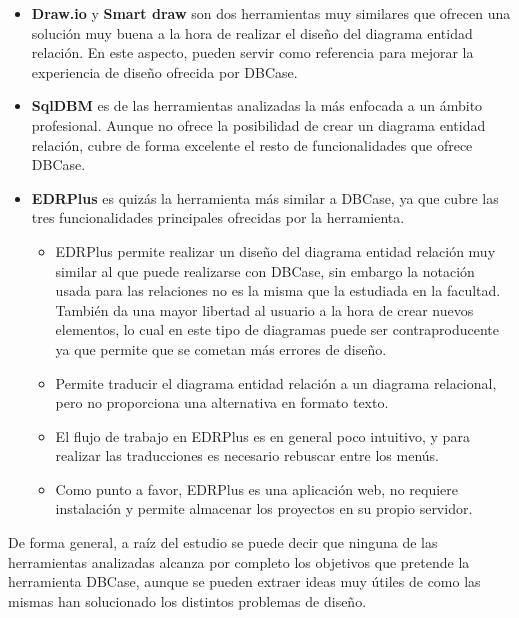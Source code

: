 \begin{itemize}
    \item \textbf{Draw.io} y \textbf{Smart draw} son dos herramientas muy similares que ofrecen una solución muy buena a la hora de realizar el diseño del diagrama entidad relación. En este aspecto, pueden servir como referencia para mejorar la experiencia de diseño ofrecida por DBCase.
    \item \textbf{SqlDBM} es de las herramientas analizadas la más enfocada a un ámbito profesional. Aunque no ofrece la posibilidad de crear un diagrama entidad relación, cubre de forma excelente el resto de funcionalidades que ofrece DBCase.
    \item \textbf{EDRPlus} es quizás la herramienta más similar a DBCase, ya que cubre las tres funcionalidades principales ofrecidas por la herramienta.
    \begin{itemize}
        \item EDRPlus permite realizar un diseño del diagrama entidad relación muy similar al que puede realizarse con DBCase, sin embargo la notación usada para las relaciones no es la misma que la estudiada en la facultad.\\
        
        También da una mayor libertad al usuario a la hora de crear nuevos elementos, lo cual en este tipo de diagramas puede ser contraproducente ya que permite que se cometan más errores de diseño.
        
        \item Permite traducir el diagrama entidad relación a un diagrama relacional, pero no proporciona una alternativa en formato texto.
        
        \item El flujo de trabajo en EDRPlus es en general poco intuitivo, y para realizar las traducciones es necesario rebuscar entre los menús.
        
        \item Como punto a favor, EDRPlus es una aplicación web, no requiere instalación y permite almacenar los proyectos en su propio servidor.
    \end{itemize}
\end{itemize}
De forma general, a raíz del estudio se puede decir que ninguna de las herramientas analizadas alcanza por completo los objetivos que pretende la herramienta DBCase, aunque se pueden extraer ideas muy útiles de como las mismas han solucionado los distintos problemas de diseño.